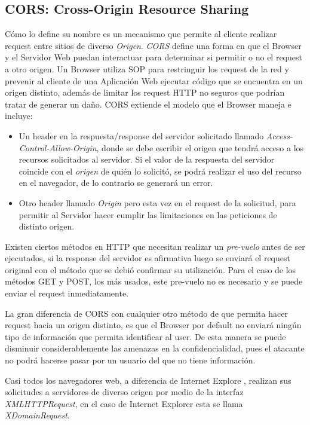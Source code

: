     \subsection{CORS: Cross-Origin Resource Sharing}
    \label{chap2:CORS}
    Cómo lo define su nombre es un mecanismo que permite al cliente realizar request entre sitios de diverso \textit{Origen}. \textit{CORS} define una forma en que el Browser y el Servidor Web puedan interactuar para determinar si permitir o no el request a otro origen. Un Browser utiliza SOP para restringuir los request de la red y prevenir al cliente de una Aplicación Web ejecutar código que se encuentra en un origen distinto, además de limitar los request HTTP no seguros que podrían tratar de generar un daño. CORS extiende el modelo que el Browser maneja e incluye:
        
        \begin{itemize}
            \item Un header en la respuesta/response del servidor solicitado llamado \textit{Access-Control-Allow-Origin}, donde se debe escribir el origen que tendrá acceso a los recursos solicitados al servidor. Si el valor de la respuesta del servidor coincide con el \textit{origen} de quién lo solicitó, se podrá realizar el uso del recurso en el navegador, de lo contrario se generará un error.
            \item Otro header llamado \textit{Origin} pero esta vez en el request de la solicitud, para permitir al Servidor hacer cumplir las limitaciones en las peticiones de distinto origen.
        \end{itemize}
        Existen ciertos métodos en HTTP que necesitan realizar un \textit{pre-vuelo} antes de ser ejecutados, si la response del servidor es afirmativa luego se enviará el request original con el método que se debió confirmar su utilización. Para el caso de los métodos GET y POST, los más usados, este pre-vuelo no es necesario y se puede enviar el request inmediatamente.
        
        La gran diferencia de CORS con cualquier otro método de que permita hacer request hacia un origen distinto, es que el Browser por default no enviará ningún tipo de información que permita identificar al user. De esta manera se puede disminuir considerablemente las amenazas en la confidencialidad, pues el atacante no podrá hacerse pasar por un usuario del que no tiene información.
        
        Casi todos los navegadores web, a diferencia de Internet Explore \cite{bookWebAppSec}, realizan sus solicitudes a servidores de  diverso origen por medio de la interfaz \textit{XMLHTTPRequest}, en el caso de Internet Explorer esta se llama \textit{XDomainRequest}.

